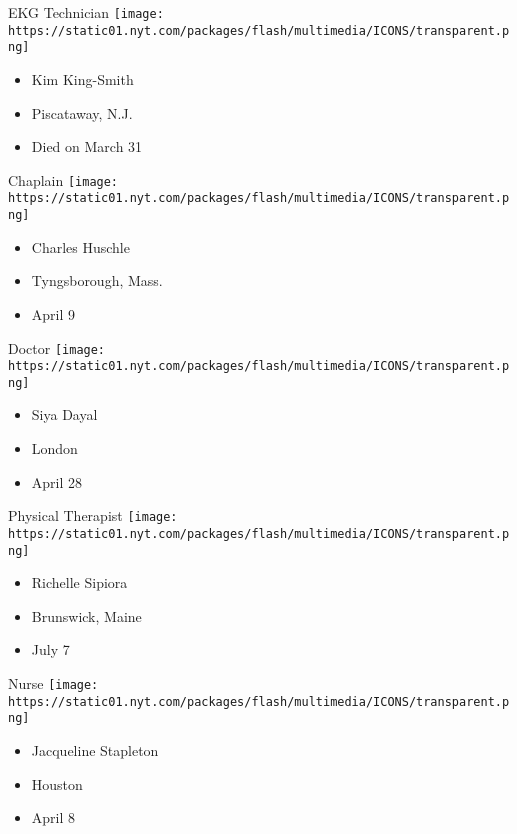 \protect\hyperlink{item-kim-king-smith}{}

EKG Technician
\texttt{[image: https://static01.nyt.com/packages/flash/multimedia/ICONS/transparent.png]}

\begin{itemize}
\tightlist
\item
  Kim King-Smith
\item
  Piscataway, N.J.
\item
  Died on March 31
\end{itemize}

\protect\hyperlink{item-charles-huschle}{}

Chaplain
\texttt{[image: https://static01.nyt.com/packages/flash/multimedia/ICONS/transparent.png]}

\begin{itemize}
\tightlist
\item
  Charles Huschle
\item
  Tyngsborough, Mass.
\item
  April 9
\end{itemize}

\protect\hyperlink{item-siya-dayal}{}

Doctor
\texttt{[image: https://static01.nyt.com/packages/flash/multimedia/ICONS/transparent.png]}

\begin{itemize}
\tightlist
\item
  Siya Dayal
\item
  London
\item
  April 28
\end{itemize}

\protect\hyperlink{item-richelle-sipiora}{}

Physical Therapist
\texttt{[image: https://static01.nyt.com/packages/flash/multimedia/ICONS/transparent.png]}

\begin{itemize}
\tightlist
\item
  Richelle Sipiora
\item
  Brunswick, Maine
\item
  July 7
\end{itemize}

\protect\hyperlink{item-jacqueline-stapleton}{}

Nurse
\texttt{[image: https://static01.nyt.com/packages/flash/multimedia/ICONS/transparent.png]}

\begin{itemize}
\tightlist
\item
  Jacqueline Stapleton
\item
  Houston
\item
  April 8
\end{itemize}

